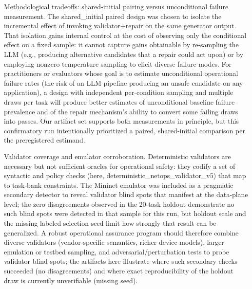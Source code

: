 \documentclass[conference]{IEEEtran}
\begin{document}
Methodological tradeoffs: shared‑initial pairing versus unconditional failure measurement. The shared\_initial paired design was chosen to isolate the incremental effect of invoking validator+repair on the same generator output. That isolation gains internal control at the cost of observing only the conditional effect on a fixed sample: it cannot capture gains obtainable by re‑sampling the LLM (e.g., producing alternative candidates that a repair could act upon) or by employing nonzero temperature sampling to elicit diverse failure modes. For practitioners or evaluators whose goal is to estimate unconditional operational failure rates (the risk of an LLM pipeline producing an unsafe candidate on any application), a design with independent per‑condition sampling and multiple draws per task will produce better estimates of unconditional baseline failure prevalence and of the repair mechanism's ability to convert some failing draws into passes. Our artifact set supports both measurements in principle, but this confirmatory run intentionally prioritized a paired, shared‑initial comparison per the preregistered estimand.

Validator coverage and emulator corroboration. Deterministic validators are necessary but not sufficient oracles for operational safety: they codify a set of syntactic and policy checks (here, deterministic\_netops\_validator\_v5) that map to task‑bank constraints. The Mininet emulator was included as a pragmatic secondary detector to reveal validator blind spots that manifest at the data‑plane level; the zero disagreements observed in the 20‑task holdout demonstrate no such blind spots were detected in that sample for this run, but holdout scale and the missing labeled selection seed limit how strongly that result can be generalized. A robust operational assurance program should therefore combine diverse validators (vendor‑specific semantics, richer device models), larger emulation or testbed sampling, and adversarial/perturbation tests to probe validator blind spots; the artifacts here illustrate where such secondary checks succeeded (no disagreements) and where exact reproducibility of the holdout draw is currently unverifiable (missing seed).
\end{document}
